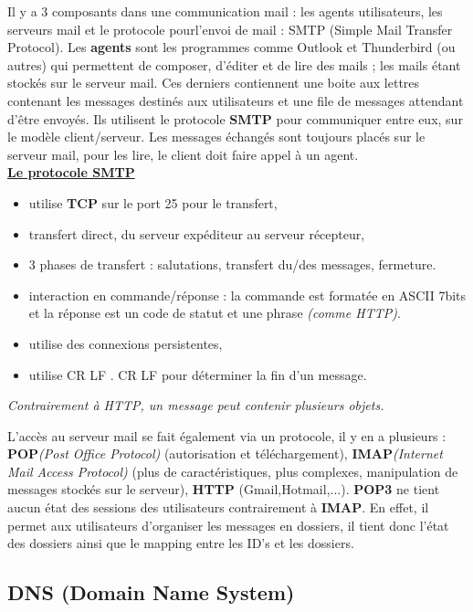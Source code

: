 \documentclass{article}
\begin{document}
Il y a 3 composants dans une communication mail : les agents utilisateurs, les serveurs mail et le protocole 
pourl'envoi de mail : SMTP (Simple Mail Transfer Protocol). Les \textbf{agents} sont les programmes comme 
Outlook et Thunderbird (ou autres) qui permettent de composer, d'éditer et de lire des mails ; les mails étant
stockés sur le serveur mail. Ces derniers contiennent une boite aux lettres contenant les messages destinés aux 
utilisateurs et une file de messages attendant d'être envoyés. Ils utilisent le protocole \textbf{SMTP} pour 
communiquer entre eux, sur le modèle client/serveur. Les messages échangés sont toujours placés sur le serveur
mail, pour les lire, le client doit faire appel à un agent.\\

\noindent\textbf{\underline{Le protocole SMTP}}
\begin{itemize}
\item utilise \textbf{TCP} sur le port 25 pour le transfert,
\item transfert direct, du serveur expéditeur au serveur récepteur,
\item 3 phases de transfert : salutations, transfert du/des messages, fermeture.
\item interaction en commande/réponse : la commande est formatée en ASCII 7bits et la réponse est un code de
statut et une phrase \textit{(comme HTTP)}.
\item utilise des connexions persistentes,
\item utilise CR LF . CR LF pour déterminer la fin d'un message.
\end{itemize}
\textit{Contrairement à HTTP, un message peut contenir plusieurs objets.}

\noindent L'accès au serveur mail se fait également via un protocole, il y en a plusieurs : 
\textbf{POP}\textit{(Post Office Protocol)} (autorisation et téléchargement), \textbf{IMAP}\textit{(Internet 
Mail Access Protocol)} (plus de caractéristiques, plus complexes, manipulation de messages stockés sur le 
serveur), \textbf{HTTP} (Gmail,Hotmail,...). \textbf{POP3} ne tient aucun état des sessions des utilisateurs 
contrairement à \textbf{IMAP}. En effet, il permet aux utilisateurs d'organiser les messages en dossiers, il 
tient donc l'état des dossiers ainsi que le mapping entre les ID's et les dossiers.

\subsection{DNS (Domain Name System)}
\end{document}
